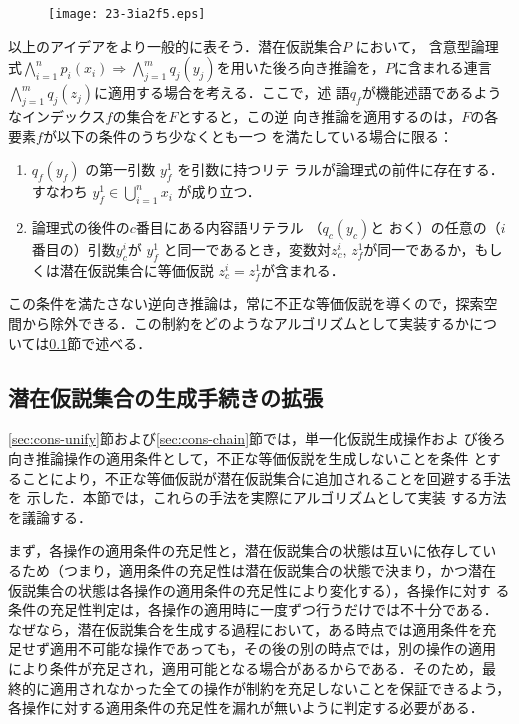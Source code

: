 \documentclass[japanese]{jnlp_1.4}
\begin{document}
\begin{figure}[b]
\begin{center}
\texttt{[image: 23-3ia2f5.eps]}
\end{center}
\label{fig:chain}
\end{figure}

以上のアイデアをより一般的に表そう．潜在仮説集合$P$ において，
含意型論理式$\bigwedge_{i=1}^n p_i(x_i) \Rightarrow \bigwedge_{j=1}^m
q_j(y_j)$を用いた後ろ向き推論を，$P$に含まれる連言
$\bigwedge_{j=1}^m q_j(z_j)$に適用する場合を考える．ここで，述
語$q_f$が機能述語であるようなインデックス$f$の集合を$F$とすると，この逆
向き推論を適用するのは，$F$の各要素$f$が以下の条件のうち少なくとも一つ
を満たしている場合に限る：
\begin{enumerate}
\item $q_f(y_f)$ の第一引数 $y_f^1$ を引数に持つリテ
	 ラルが論理式の前件に存在する．すなわち $y_f^1 \in
	 \bigcup_{i=1}^n x_i$ が成り立つ．
\item 論理式の後件の$c$番目にある内容語リテラル （$q_c(y_c)$と
	 おく）の任意の（$i$番目の）引数$y_c^i$が
	 $y_f^1$ と同一であるとき，変数対$z_c^i$, $ z_f^1$が同一であるか，もしくは潜在仮説集合に等価仮説
	 $z_c^i = z_f^1$が含まれる．
\end{enumerate}
この条件を満たさない逆向き推論は，常に不正な等価仮説を導くので，探索空
間から除外できる．この制約をどのようなアルゴリズムとして実装するかにつ
いては\ref{sec:cons-implement}節で述べる．


\subsection{潜在仮説集合の生成手続きの拡張}
\label{sec:cons-implement}

\ref{sec:cons-unify}節および\ref{sec:cons-chain}節では，単一化仮説生成操作およ
び後ろ向き推論操作の適用条件として，不正な等価仮説を生成しないことを条件
とすることにより，不正な等価仮説が潜在仮説集合に追加されることを回避する手法を
示した．本節では，これらの手法を実際にアルゴリズムとして実装
する方法を議論する．

まず，各操作の適用条件の充足性と，潜在仮説集合の状態は互いに依存してい
るため（つまり，適用条件の充足性は潜在仮説集合の状態で決まり，かつ潜在
仮説集合の状態は各操作の適用条件の充足性により変化する），各操作に対す
る条件の充足性判定は，各操作の適用時に一度ずつ行うだけでは不十分である．
なぜなら，潜在仮説集合を生成する過程において，ある時点では適用条件を充
足せず適用不可能な操作であっても，その後の別の時点では，別の操作の適用
により条件が充足され，適用可能となる場合があるからである．そのため，最
終的に適用されなかった全ての操作が制約を充足しないことを保証できるよう，
各操作に対する適用条件の充足性を漏れが無いように判定する必要がある．
\end{document}
